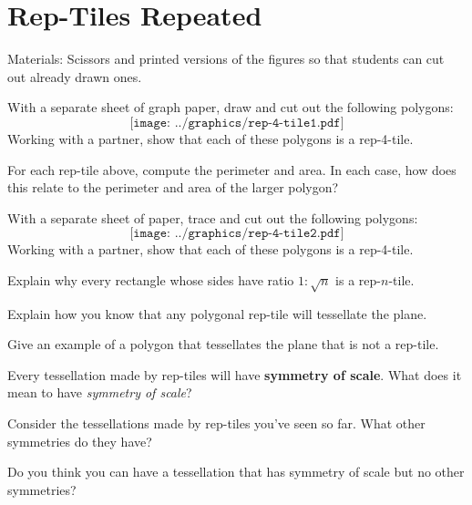 \newpage
\section{Rep-Tiles Repeated}

\begin{teachingnote}
Materials:  Scissors and printed versions of the figures so that students can cut out already drawn ones.   
\end{teachingnote}

\begin{prob}
With a separate sheet of graph paper, draw and cut out the following polygons:
\[
\texttt{[image: ../graphics/rep-4-tile1.pdf]}
\]
Working with a partner, show that each of these polygons is a rep-4-tile.
\end{prob}

\begin{prob}
For each rep-tile above, compute the perimeter and area. In each case,
how does this relate to the perimeter and area of the larger polygon?
\end{prob}


\begin{prob}
With a separate sheet of paper, trace and cut out the following
polygons:
\[
\texttt{[image: ../graphics/rep-4-tile2.pdf]}
\]
Working with a partner, show that each of these polygons is a rep-4-tile.
\end{prob}


\begin{prob}
Explain why every rectangle whose sides have ratio $1:\sqrt{n}$ is a
rep-$n$-tile.
\end{prob}

\begin{prob}
Explain how you know that any polygonal rep-tile will tessellate the plane.
\end{prob}

\begin{prob}
Give an example of a polygon that tessellates the plane that is not a
rep-tile.
\end{prob}


\begin{prob}
Every tessellation made by rep-tiles will have \textbf{symmetry of scale}. What does it mean to have \textit{symmetry of scale}?
\end{prob}

\begin{prob}
Consider the tessellations made by rep-tiles you've seen so far. What
other symmetries do they have?
\end{prob}

\begin{prob}
Do you think you can have a tessellation that has symmetry of scale
but no other symmetries?
\end{prob}
